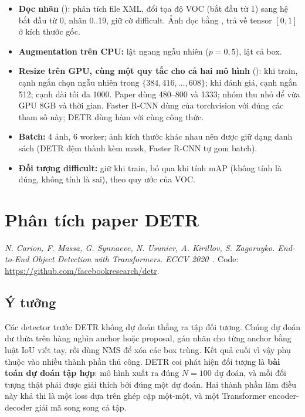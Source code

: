 \documentclass[11pt, a4paper]{article}
\begin{document}
\begin{itemize}
  \item \textbf{Đọc nhãn} (): phân tích file XML, đổi tọa độ VOC (bắt đầu từ 1) sang hệ bắt đầu từ 0, nhãn 0..19, giữ cờ difficult. Ảnh đọc bằng , trả về tensor $[0,1]$ ở kích thước gốc.
  \item \textbf{Augmentation trên CPU:} lật ngang ngẫu nhiên ($p = 0{,}5$), lật cả box.
  \item \textbf{Resize trên GPU, cùng một quy tắc cho cả hai mô hình} (): khi train, cạnh ngắn chọn ngẫu nhiên trong $\{384, 416, \dots, 608\}$; khi đánh giá, cạnh ngắn 512; cạnh dài tối đa 1000. Paper dùng 480--800 và 1333; nhóm thu nhỏ để vừa GPU 8GB và thời gian. Faster R-CNN dùng  của torchvision với đúng các tham số này; DETR dùng hàm  với cùng công thức.
  \item \textbf{Batch:} 4 ảnh, 6 worker; ảnh kích thước khác nhau nên được giữ dạng danh sách (DETR đệm thành  kèm mask, Faster R-CNN tự gom batch).
  \item \textbf{Đối tượng difficult:} giữ khi train, bỏ qua khi tính mAP (không tính là đúng, không tính là sai), theo quy ước của VOC.
\end{itemize}

\section{Phân tích paper DETR}
\label{sec:paper}

\textit{N. Carion, F. Massa, G. Synnaeve, N. Usunier, A. Kirillov, S. Zagoruyko. End-to-End Object Detection with Transformers. ECCV 2020}~\cite{carion2020detr}. Code: \url{https://github.com/facebookresearch/detr}.

\subsection{Ý tưởng}
Các detector trước DETR không dự đoán thẳng ra tập đối tượng. Chúng dự đoán dư thừa trên hàng nghìn anchor hoặc proposal, gán nhãn cho từng anchor bằng luật IoU viết tay, rồi dùng NMS để xóa các box trùng. Kết quả cuối vì vậy phụ thuộc vào nhiều thành phần thủ công. DETR coi phát hiện đối tượng là \textbf{bài toán dự đoán tập hợp}: mô hình xuất ra đúng $N = 100$ dự đoán, và mỗi đối tượng thật phải được giải thích bởi đúng một dự đoán. Hai thành phần làm điều này khả thi là một loss dựa trên ghép cặp một-một, và một Transformer encoder-decoder giải mã song song cả tập.
\end{document}
